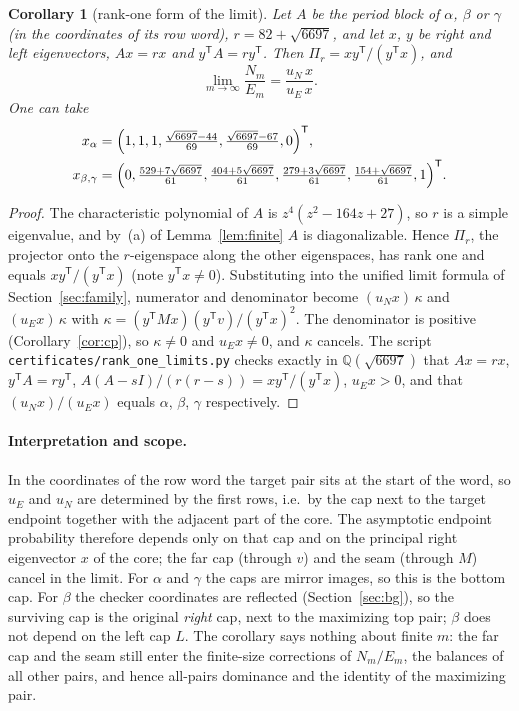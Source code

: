 \documentclass[11pt]{amsart}
\newtheorem{corollary}[theorem]{Corollary}
\theoremstyle{definition}
\theoremstyle{remark}
\begin{document}
\begin{corollary}[rank-one form of the limit]\label{cor:rankone}
Let $A$ be the period block of $\alpha$, $\beta$ or $\gamma$ (in the coordinates of its row word), $r=82+\sqrt{6697}$, and let $x$, $y$ be right and left eigenvectors, $Ax=rx$ and $y^{\mathsf T}A=ry^{\mathsf T}$. Then $\Pi_r=xy^{\mathsf T}/(y^{\mathsf T}x)$, and
\[
\lim_{m\to\infty}\frac{N_m}{E_m}=\frac{u_N\,x}{u_E\,x}.
\]
One can take
\begin{align*}
x_\alpha&=\Bigl(1,1,1,\tfrac{\sqrt{6697}-44}{69},\tfrac{\sqrt{6697}-67}{69},0\Bigr)^{\mathsf T},\\
x_{\beta,\gamma}&=\Bigl(0,\tfrac{529+7\sqrt{6697}}{61},\tfrac{404+5\sqrt{6697}}{61},\tfrac{279+3\sqrt{6697}}{61},\tfrac{154+\sqrt{6697}}{61},1\Bigr)^{\mathsf T}.
\end{align*}
\end{corollary}
\begin{proof}
The characteristic polynomial of $A$ is $z^4(z^2-164z+27)$, so $r$ is a simple eigenvalue, and by~(a) of Lemma~\ref{lem:finite} $A$ is diagonalizable. Hence $\Pi_r$, the projector onto the $r$-eigenspace along the other eigenspaces, has rank one and equals $xy^{\mathsf T}/(y^{\mathsf T}x)$ (note $y^{\mathsf T}x\ne0$). Substituting into the unified limit formula of Section~\ref{sec:family}, numerator and denominator become $(u_Nx)\,\kappa$ and $(u_Ex)\,\kappa$ with $\kappa=(y^{\mathsf T}Mx)(y^{\mathsf T}v)/(y^{\mathsf T}x)^2$. The denominator is positive (Corollary~\ref{cor:cp}), so $\kappa\ne0$ and $u_Ex\ne0$, and $\kappa$ cancels. The script \texttt{certificates/rank\_one\_limits.py} checks exactly in $\mathbb{Q}(\sqrt{6697})$ that $Ax=rx$, $y^{\mathsf T}A=ry^{\mathsf T}$, $A(A-sI)/(r(r-s))=xy^{\mathsf T}/(y^{\mathsf T}x)$, $u_Ex>0$, and that $(u_Nx)/(u_Ex)$ equals $\alpha$, $\beta$, $\gamma$ respectively.
\end{proof}

\paragraph{Interpretation and scope.} In the coordinates of the row word the target pair sits at the start of the word, so $u_E$ and $u_N$ are determined by the first rows, i.e.\ by the cap next to the target endpoint together with the adjacent part of the core. The asymptotic endpoint probability therefore depends only on that cap and on the principal right eigenvector $x$ of the core; the far cap (through $v$) and the seam (through $M$) cancel in the limit. For $\alpha$ and $\gamma$ the caps are mirror images, so this is the bottom cap. For $\beta$ the checker coordinates are reflected (Section~\ref{sec:bg}), so the surviving cap is the original \emph{right} cap, next to the maximizing top pair; $\beta$ does not depend on the left cap $L$. The corollary says nothing about finite $m$: the far cap and the seam still enter the finite-size corrections of $N_m/E_m$, the balances of all other pairs, and hence all-pairs dominance and the identity of the maximizing pair.
\end{document}
